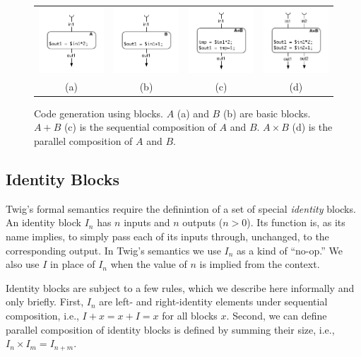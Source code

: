 \begin{figure}[ht]
\centering
\begin{tabular}{cccc}
\includegraphics[width=1.1in]{images/codegen-a}& 
\includegraphics[width=1.1in]{images/codegen-b}& 
\includegraphics[width=1.1in]{images/codegen-seq}& 
\includegraphics[width=1.1in]{images/codegen-par}\\
(a)&(b)&(c)&(d)\\
\end{tabular}
\caption{Code generation using blocks. $A$ (a) and $B$ (b) are basic blocks. $A+B$ (c) is the sequential composition of $A$ and $B$. $A \times B$ (d) is the parallel composition of $A$ and $B$.}
\label{fig:codegen}
\end{figure}


\subsection{Identity Blocks}

Twig's formal semantics require the definintion of a set of special \emph{identity} blocks. An identity block $I_n$ has $n$ inputs and $n$ outputs ($n > 0$). Its function is, as its name implies, to simply pass each of its inputs through, unchanged, to the corresponding output. In Twig's semantics we use $I_n$ as a kind of ``no-op.'' We also use $I$ in place of $I_n$ when the value of $n$ is implied from the context.

Identity blocks are subject to a few rules, which we describe here informally and only briefly. First, $I_n$ are left- and right-identity elements under sequential composition, i.e., $I + x = x + I = x$ for all blocks $x$. Second, we can define parallel composition of identity blocks is defined by summing their size, i.e., $I_n \times I_m = I_{n + m}$.
